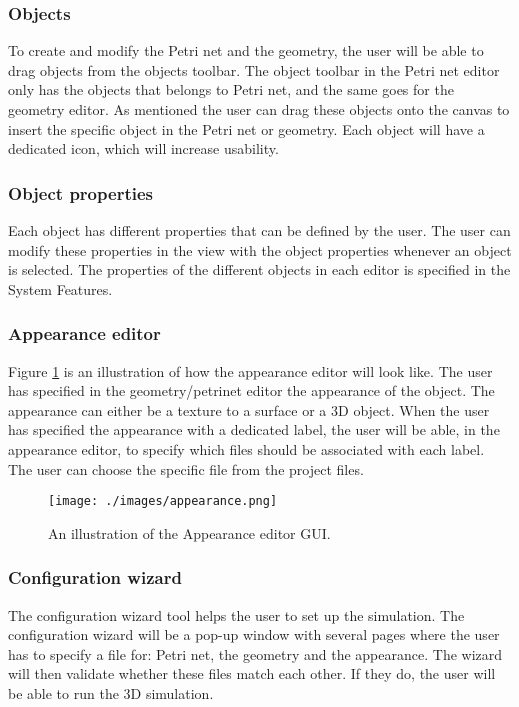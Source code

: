 \documentclass[fontsize=12pt, paper=a4]{article}
\begin{document}
\subsubsection{Objects}
To create and modify the Petri net and the geometry, the user will be able to drag objects from the objects toolbar. The object toolbar in the Petri net editor only has the objects that belongs to Petri net, and the same goes for the geometry editor. As mentioned the user can drag these objects onto the canvas to insert the specific object in the Petri net or geometry. Each object will have a dedicated icon, which will increase usability.

\subsubsection{Object properties}
Each object has different properties that can be defined by the user. The user can modify these properties in the view with the object properties whenever an object is selected. The properties of the different objects in each editor is specified in the System Features. 

\subsubsection{Appearance editor}
Figure \ref{fig:appearance_editor} is an illustration of how the appearance editor will look like. The user has specified in the geometry/petrinet editor the appearance of the object. The appearance can either be a texture to a surface or a 3D object. When the user has specified the appearance with a dedicated label, the user will be able, in the appearance editor, to specify which files should be associated with each label. The user can choose the specific file from the project files.

\begin{figure}[H]
\begin{center}
\texttt{[image: ./images/appearance.png]}
\caption{An illustration of the Appearance editor GUI.}
\label{fig:appearance_editor}
\end{center}
\end{figure}

\subsubsection{Configuration wizard}
The configuration wizard tool helps the user to set up the simulation. The configuration wizard will be a pop-up window with several pages where the user has to specify a file for: Petri net, the geometry and the appearance. The wizard will then validate whether these files match each other. If they do, the user will be able to run the 3D simulation. 
\end{document}
